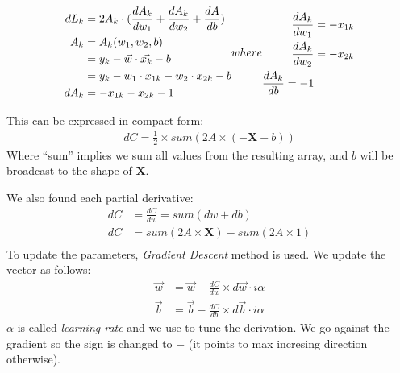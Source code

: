 \begin{align*}
  dL_k  &= 2A_k\cdot{}(\frac{dA_k}{dw_1} + \frac{dA_k}{dw_2} + \frac{dA}{db}) \\
  A_k &= A_k(w_1, w_2, b)\\
  &= y_k - \vec{w}\cdot{}\vec{x_k} - b\\
  &= y_k - w_1\cdot{}x_{1k} - w_2\cdot{}x_{2k} -b\\
  dA_k &= -x_{1k} - x_{2k} -1
\end{align}
where 
\begin{align*}
 \frac{dA_{k}}{dw_1} &= -x_{1k}\\ 
  \frac{dA_{k}}{dw_2} &= -x_{2k}\\ 
  \frac{dA_k}{db} = -1
\end{align*} 

This can be expressed in compact form:
\begin{align}
  dC = \frac{1}{2}\times{}sum(2A\times(-\mathbf{X} -b))
\end{align}
Where ``sum'' implies we sum all values from the resulting array, and $b$ will be broadcast to the shape of $\mathbf{X}$.

We also found each partial derivative:
\begin{align}
  dC &= \frac{dC}{dw} = sum(dw+db)\\
 dC &= sum(2A\times{}\mathbf{X}) - sum(2A\times{}1)\\
\end{align}
To update the parameters, \textit{Gradient Descent} method is used. We update the vector  as follows:
\begin{align}
  \vec{w} &= \vec{w} -\frac{dC}{dw}\times{}d\vec{w}\cdot{i}\alpha\\
  \vec{b} &= \vec{b} -\frac{dC}{db}\times{}d\vec{b}\cdot{i}\alpha
\end{align}
$\alpha$ is called \textit{learning rate} and we use to tune the derivation. We go against the gradient so the sign is changed to $-$ (it points to max incresing direction otherwise).
